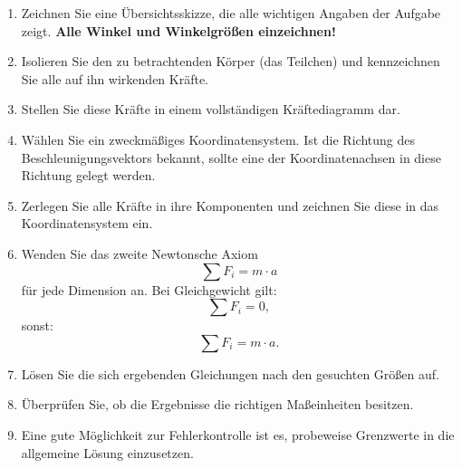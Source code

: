 \documentclass[10pt,a4paper]{article}
\begin{document}
		\begin{enumerate}
			\item Zeichnen Sie eine Übersichtsskizze, die alle wichtigen Angaben der Aufgabe zeigt. 
			\textbf{Alle Winkel und Winkelgrößen einzeichnen!}
			
			\item Isolieren Sie den zu betrachtenden Körper (das Teilchen) und kennzeichnen Sie alle auf ihn wirkenden Kräfte.
			
			\item Stellen Sie diese Kräfte in einem vollständigen Kräftediagramm dar.
			
			\item Wählen Sie ein zweckmäßiges Koordinatensystem. 
			Ist die Richtung des Beschleunigungsvektors bekannt, sollte eine der Koordinatenachsen in diese Richtung gelegt werden.
			
			\item Zerlegen Sie alle Kräfte in ihre Komponenten und zeichnen Sie diese in das Koordinatensystem ein.
			
			\item Wenden Sie das zweite Newtonsche Axiom 
			\[
			\sum F_i = m \cdot a
			\]
			für jede Dimension an.  
			Bei Gleichgewicht gilt:
			\[
			\sum F_i = 0,
			\]
			sonst:
			\[
			\sum F_i = m \cdot a.
			\]
			
			\item Lösen Sie die sich ergebenden Gleichungen nach den gesuchten Größen auf.
			
			\item Überprüfen Sie, ob die Ergebnisse die richtigen Maßeinheiten besitzen.
			
			\item Eine gute Möglichkeit zur Fehlerkontrolle ist es, probeweise Grenzwerte 
			in die allgemeine Lösung einzusetzen.
		\end{enumerate}
		
\end{document}
